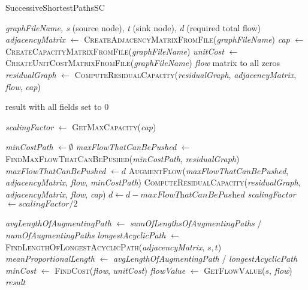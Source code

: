 \documentclass{article}
\begin{document}
\begin{algorithm}[H]
\caption{\textcolor{keywordcolor}{SuccessiveShortestPathsSC}}
\begin{algorithmic}[1]
\State {} \textit{graphFileName, s} (source node), \textit{t} (sink node), \textit{d} (required total flow)
\State \textit{adjacencyMatrix} $\gets$ \textcolor{identifiercolor}{\textsc{CreateAdjacencyMatrixFromFile}}(\textit{graphFileName})
\State \textit{cap} $\gets$ \textcolor{identifiercolor}{\textsc{CreateCapacityMatrixFromFile}}(\textit{graphFileName})
\State \textit{unitCost} $\gets$ \textcolor{identifiercolor}{\textsc{CreateUnitCostMatrixFromFile}}(\textit{graphFileName})
\State {} \textit{flow} matrix to all zeros
\State \textit{residualGraph} $\gets$ \textcolor{identifiercolor}{\textsc{ComputeResidualCapacity}}(\textit{residualGraph}, \textit{adjacencyMatrix}, \textit{flow}, \textit{cap})

    \State \Return result with all fields set to 0
\EndIf

\State \textit{scalingFactor} $\gets$ \textcolor{identifiercolor}{\textsc{GetMaxCapacity}}(\textit{cap})

        \State {} \textit{minCostPath} $\gets \emptyset$
        \State \textit{maxFlowThatCanBePushed} $\gets$ \textcolor{identifiercolor}{\textsc{FindMaxFlowThatCanBePushed}}(\textit{minCostPath}, \textit{residualGraph})
            \State \textit{maxFlowThatCanBePushed} $\gets d$
        \EndIf
        \State \textcolor{identifiercolor}{\textsc{AugmentFlow}}(\textit{maxFlowThatCanBePushed}, \textit{adjacencyMatrix}, \textit{flow}, \textit{minCostPath})
        \State \textcolor{identifiercolor}{\textsc{ComputeResidualCapacity}}(\textit{residualGraph}, \textit{adjacencyMatrix}, \textit{flow}, \textit{cap})
        \State $d \gets d - \textit{maxFlowThatCanBePushed}$
    \EndWhile
    \State \textit{scalingFactor} $\gets \textit{scalingFactor} / 2$
\EndWhile

\State \textit{avgLengthOfAugmentingPath} $\gets$ \textit{sumOfLengthsOfAugmentingPaths} / \textit{numOfAugmentingPaths}
\State \textit{longestAcyclicPath} $\gets$ \textcolor{identifiercolor}{\textsc{FindLengthOfLongestAcyclicPath}}(\textit{adjacencyMatrix}, $s, t$)
\State \textit{meanProportionalLength} $\gets$ \textit{avgLengthOfAugmentingPath} / \textit{longestAcyclicPath}
\State \textit{minCost} $\gets$ \textcolor{identifiercolor}{\textsc{FindCost}}(\textit{flow}, \textit{unitCost})
\State \textit{flowValue} $\gets$ \textcolor{identifiercolor}{\textsc{GetFlowValue}}($s$, \textit{flow})
\State \Return \textit{result}
\end{algorithmic}
\end{algorithm}
\end{document}
